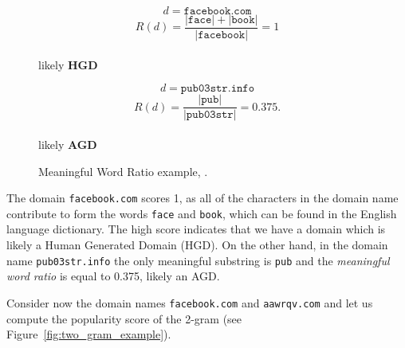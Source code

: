 \begin{figure}[!htp]
    \begin{minipage}{0.5\linewidth}
        \centering
        $$ d = \mathtt{facebook.com}$$\vspace{-0.2cm}
        $$R(d) = \frac{|\mathtt{face}| +|\mathtt{book}|}{|\mathtt{facebook}|} = 1$$
        \vspace{0.3cm} \\ likely \bfseries{HGD}
        \end{minipage}\begin{minipage}{0.5\linewidth}
        \centering
        $$ d = \mathtt{pub03str.info}$$\vspace{-0.2cm}
        $$R(d) = \frac{|\mathtt{pub}|}{|\mathtt{pub03str}|} = 0.375.$$
        \vspace{0.3cm} \\ likely \bfseries{AGD}
    \end{minipage}
    \caption{Meaningful Word Ratio example, \citet{schiavoni2013}.}
    \label{fig:words_ratio}
\end{figure}

The domain \texttt{facebook.com} scores 1, as all of the characters in the domain
name contribute to form the words \texttt{face} and \texttt{book}, which can
be found in the English language dictionary. The high score indicates that we have a domain which is likely a Human Generated Domain (HGD). On the other hand, in the domain name
\texttt{pub03str.info} the only meaningful substring is \texttt{pub} and the
\emph{meaningful word ratio} is equal to 0.375, likely an AGD.

Consider now the domain names \texttt{facebook.com} and \texttt{aawrqv.com} and let
us compute the popularity score of the 2-gram (see Figure~\ref{fig:two_gram_example}).

